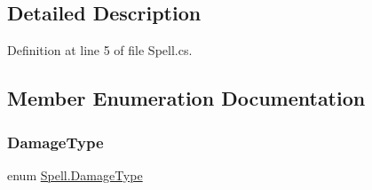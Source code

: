 \subsection{Detailed Description}


Definition at line 5 of file Spell.\+cs.



\subsection{Member Enumeration Documentation}
\mbox{\label{class_spell_a3e228beaf92e2c035e6599aaf0ac2d2a}} 
\subsubsection{\texorpdfstring{DamageType}{DamageType}}
{\footnotesize\ttfamily enum \mbox{\hyperlink{class_spell_a3e228beaf92e2c035e6599aaf0ac2d2a}{Spell.\+Damage\+Type}}\hspace{0.3cm}{\ttfamily [strong]}}

